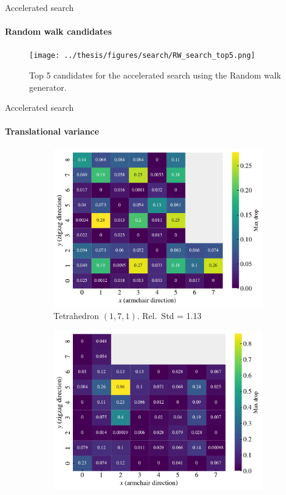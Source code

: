 \documentclass[
	10pt, %
]{beamer}
\begin{document}
%
%
\begin{frame}{Accelerated search}
	\framesubtitle{Random walk candidates}
	\begin{figure}[H]
		\centering
		\texttt{[image: ../thesis/figures/search/RW\_search\_top5.png]}
		\caption{Top 5 candidates for the accelerated search using the Random walk generator. }
	\end{figure}  
\end{frame}
%
%
\begin{frame}{Accelerated search}
	\framesubtitle{Translational variance}
	\begin{figure}[H]
		\centering
		\begin{subfigure}[t]{0.49\textwidth}
			\centering
			\includegraphics[width=\textwidth]{../thesis/figures/search/ref_search_drop_pop_1_7_1_ref_search.pdf}
			\caption{Tetrahedron $(1,7,1)$. Rel.\ Std = 1.13}
			\label{fig:tetra_171_trans}
		\end{subfigure}
		\hfill
		\begin{subfigure}[t]{0.49\textwidth}
			\centering
			\includegraphics[width=\textwidth]{../thesis/figures/search/ref_search_drop_pop_5_3_1_ref_search.pdf}

\end{subfigure}
\end{figure}
\end{frame}
\end{document}
